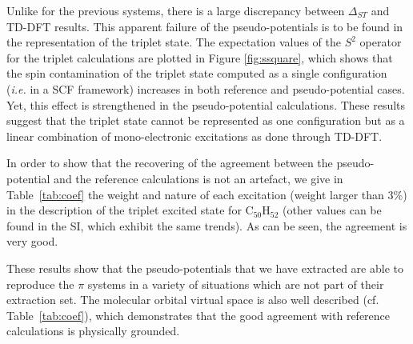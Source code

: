 \documentclass[12pt]{article}
\begin{document}
Unlike for the previous systems, there is a large discrepancy between $\Delta_{ST}$
and TD-DFT results.
This apparent failure of the pseudo-potentials is to be found in the representation
of the triplet state. The expectation values of the $S^2$ operator for the triplet calculations
are plotted in Figure \ref{fig:ssquare}, which shows that the spin contamination
of the triplet state computed as a single configuration (\emph{i.e.} in a SCF
framework) increases in both reference and pseudo-potential cases.
Yet, this effect is strengthened in the pseudo-potential calculations.
These results suggest that the triplet state cannot be represented as one configuration
but as a linear combination of mono-electronic excitations as done through TD-DFT.

In order to show that the recovering of the agreement between the pseudo-potential
and the reference calculations is not an artefact, we give in Table~\ref{tab:coef}
the weight and nature of each excitation (weight larger than 3\%)
in the description of the triplet excited state for
C$_{50}$H$_{52}$ (other values can be found in the SI, which exhibit the same trends).
As can be seen, the agreement is very good. 

These results show that the pseudo-potentials that we have extracted are able to reproduce the
$\pi$ systems in a variety of situations which are not part of their extraction set.
The molecular orbital virtual space is also well described (cf. Table~\ref{tab:coef}),
which demonstrates that the good agreement with reference calculations is
physically grounded.


\clearpage
\end{document}
